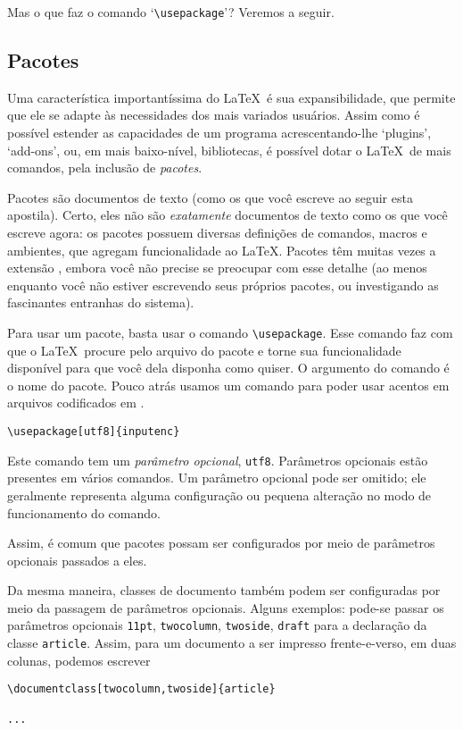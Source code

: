 Mas o que faz o comando `\verb'\usepackage''? Veremos a seguir.

\subsection{Pacotes}

Uma característica importantíssima do \LaTeX\  é sua
expansibilidade, que permite que ele se adapte às necessidades
dos mais variados usuários. Assim como é possível estender as
capacidades de um programa acrescentando-lhe `plugins', `add-ons', ou,
em mais baixo-nível, bibliotecas, é possível dotar o \LaTeX\ de mais
comandos, pela inclusão de \emph{pacotes}.

Pacotes são documentos de texto (como os que você escreve ao seguir
esta apostila). Certo, eles não são \emph{exatamente} documentos de
texto como os que você escreve agora: os pacotes possuem diversas
definições de comandos, macros e ambientes, que agregam funcionalidade
ao \LaTeX. Pacotes têm muitas vezes a extensão , embora
você não precise se preocupar com esse detalhe (ao menos enquanto você
não estiver escrevendo seus próprios pacotes, ou investigando as
fascinantes entranhas do sistema).

Para usar um pacote, basta usar o comando \verb'\usepackage'. Esse
comando faz com que o \LaTeX\ procure pelo arquivo do pacote e torne
sua funcionalidade disponível para que você dela disponha como quiser.
O argumento do comando é o nome do pacote. Pouco atrás usamos um
comando para poder usar acentos em arquivos codificados em .
\begin{center}\footnotesize
\begin{verbatim}
\usepackage[utf8]{inputenc}
\end{verbatim}
\end{center}

Este comando tem um \emph{parâmetro opcional},
\texttt{utf8}. Parâmetros opcionais estão presentes em vários
comandos. Um parâmetro opcional pode ser omitido; ele geralmente
representa alguma configuração ou pequena alteração no modo de
funcionamento do comando.

Assim, é comum que pacotes possam ser configurados por meio de
parâmetros opcionais passados a eles.

Da mesma maneira, classes de documento também podem ser configuradas
por meio da passagem de parâmetros opcionais. Alguns exemplos: pode-se
passar os parâmetros opcionais \texttt{11pt}, \texttt{twocolumn},
\texttt{twoside}, \texttt{draft} para a declaração da classe
\texttt{article}. Assim, para um documento a ser impresso
frente-e-verso, em duas colunas, podemos escrever
\begin{footnotesize}
\begin{verbatim}
\documentclass[twocolumn,twoside]{article}

...

\end{verbatim}
\end{footnotesize}

